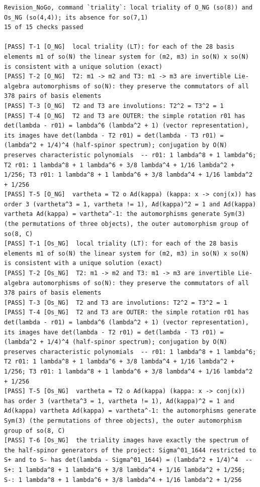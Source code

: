 \documentclass[
  10pt,
]{article}
\begin{document}
\begin{verbatim}
Revision_NoGo, command `triality`: local triality of O_NG (so(8)) and Os_NG (so(4,4)); its absence for so(7,1)
15 of 15 checks passed

[PASS] T-1 [O_NG]  local triality (LT): for each of the 28 basis elements m1 of so(N) the linear system for (m2, m3) in so(N) x so(N) is consistent with a unique solution (exact)
[PASS] T-2 [O_NG]  T2: m1 -> m2 and T3: m1 -> m3 are invertible Lie-algebra automorphisms of so(N): they preserve the commutators of all 378 pairs of basis elements
[PASS] T-3 [O_NG]  T2 and T3 are involutions: T2^2 = T3^2 = 1
[PASS] T-4 [O_NG]  T2 and T3 are OUTER: the simple rotation r01 has det(lambda - r01) = lambda^6 (lambda^2 + 1) (vector representation), its images have det(lambda - T2 r01) = det(lambda - T3 r01) = (lambda^2 + 1/4)^4 (half-spinor spectrum); conjugation by O(N) preserves characteristic polynomials  -- r01: 1 lambda^8 + 1 lambda^6; T2 r01: 1 lambda^8 + 1 lambda^6 + 3/8 lambda^4 + 1/16 lambda^2 + 1/256; T3 r01: 1 lambda^8 + 1 lambda^6 + 3/8 lambda^4 + 1/16 lambda^2 + 1/256
[PASS] T-5 [O_NG]  vartheta = T2 o Ad(kappa) (kappa: x -> conj(x)) has order 3 (vartheta^3 = 1, vartheta != 1), Ad(kappa)^2 = 1 and Ad(kappa) vartheta Ad(kappa) = vartheta^-1: the automorphisms generate Sym(3) (the permutations of three objects), the outer automorphism group of so(8, C)
[PASS] T-1 [Os_NG]  local triality (LT): for each of the 28 basis elements m1 of so(N) the linear system for (m2, m3) in so(N) x so(N) is consistent with a unique solution (exact)
[PASS] T-2 [Os_NG]  T2: m1 -> m2 and T3: m1 -> m3 are invertible Lie-algebra automorphisms of so(N): they preserve the commutators of all 378 pairs of basis elements
[PASS] T-3 [Os_NG]  T2 and T3 are involutions: T2^2 = T3^2 = 1
[PASS] T-4 [Os_NG]  T2 and T3 are OUTER: the simple rotation r01 has det(lambda - r01) = lambda^6 (lambda^2 + 1) (vector representation), its images have det(lambda - T2 r01) = det(lambda - T3 r01) = (lambda^2 + 1/4)^4 (half-spinor spectrum); conjugation by O(N) preserves characteristic polynomials  -- r01: 1 lambda^8 + 1 lambda^6; T2 r01: 1 lambda^8 + 1 lambda^6 + 3/8 lambda^4 + 1/16 lambda^2 + 1/256; T3 r01: 1 lambda^8 + 1 lambda^6 + 3/8 lambda^4 + 1/16 lambda^2 + 1/256
[PASS] T-5 [Os_NG]  vartheta = T2 o Ad(kappa) (kappa: x -> conj(x)) has order 3 (vartheta^3 = 1, vartheta != 1), Ad(kappa)^2 = 1 and Ad(kappa) vartheta Ad(kappa) = vartheta^-1: the automorphisms generate Sym(3) (the permutations of three objects), the outer automorphism group of so(8, C)
[PASS] T-6 [Os_NG]  the triality images have exactly the spectrum of the half-spinor generators of the project: Sigma^01_1644 restricted to S+ and to S- has det(lambda - Sigma^01_1644) = (lambda^2 + 1/4)^4  -- S+: 1 lambda^8 + 1 lambda^6 + 3/8 lambda^4 + 1/16 lambda^2 + 1/256; S-: 1 lambda^8 + 1 lambda^6 + 3/8 lambda^4 + 1/16 lambda^2 + 1/256

\end{verbatim}
\end{document}
